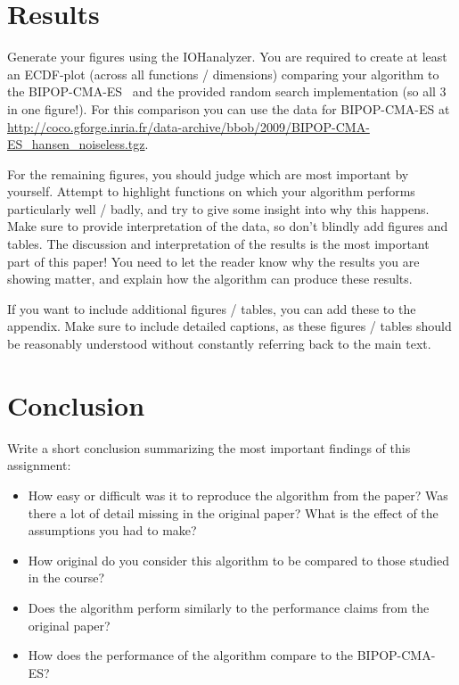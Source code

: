 \documentclass[runningheads]{llncs}
\begin{document}
\section{Results}
Generate your figures using the IOHanalyzer. You are required to create at least an ECDF-plot (across all functions / dimensions) comparing your algorithm to the BIPOP-CMA-ES~\cite{COCOperformace} and the provided random search implementation (so all 3 in one figure!). For this comparison you can use the data for BIPOP-CMA-ES at \url{http://coco.gforge.inria.fr/data-archive/bbob/2009/BIPOP-CMA-ES_hansen_noiseless.tgz}.

For the remaining figures, you should judge which are most important by yourself. Attempt to highlight functions on which your algorithm performs particularly well / badly, and try to give some insight into why this happens. Make sure to provide interpretation of the data, so don't blindly add figures and tables. The discussion and interpretation of the results is the most important part of this paper! You need to let the reader know why the results you are showing matter, and explain how the algorithm can produce these results.

If you want to include additional figures / tables, you can add these to the appendix. Make sure to include detailed captions, as these figures / tables should be reasonably understood without constantly referring back to the main text.



\section{Conclusion}
Write a short conclusion summarizing the most important findings of this assignment:
\begin{itemize}
    \item How easy or difficult was it to reproduce the algorithm from the paper? Was there a lot of detail missing in the original paper? What is the effect of the assumptions you had to make?
    \item How original do you consider this algorithm to be compared to those studied in the course?
    \item Does the algorithm perform similarly to the performance claims from the original paper?
    \item How does the performance of the algorithm compare to the BIPOP-CMA-ES?
\end{itemize}
\end{document}
